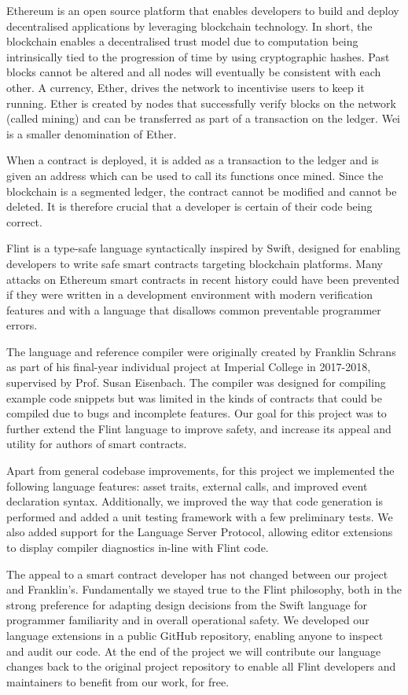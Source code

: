 Ethereum is an open source platform that enables developers to build and deploy decentralised applications by leveraging blockchain technology\cite{bg-ethereum}. In short, the blockchain enables a decentralised trust model due to computation being intrinsically tied to the progression of time by using cryptographic hashes\cite{ptb}. Past blocks cannot be altered and all nodes will eventually be consistent with each other. A currency, Ether, drives the network to incentivise users to keep it running. Ether is created by nodes that successfully verify blocks on the network (called mining) and can be transferred as part of a transaction on the ledger. Wei is a smaller denomination of Ether.

When a contract is deployed, it is added as a transaction to the ledger and is given an address which can be used to call its functions once mined\cite{md-mp}. Since the blockchain is a segmented ledger, the contract cannot be modified and cannot be deleted. It is therefore crucial that a developer is certain of their code being correct\cite{yp}.

Flint is a type-safe language syntactically inspired by Swift, designed for enabling developers to write safe smart contracts targeting blockchain platforms\cite{flint-paper}. Many attacks on Ethereum smart contracts in recent history could have been prevented if they were written in a development environment with modern verification features and with a language that disallows common preventable programmer errors.

The language and reference compiler were originally created by Franklin Schrans as part of his final-year individual project at Imperial College in 2017-2018, supervised by Prof. Susan Eisenbach\cite{flint}. The compiler was designed for compiling example code snippets but was limited in the kinds of contracts that could be compiled due to bugs and incomplete features. Our goal for this project was to further extend the Flint language to improve safety, and increase its appeal and utility for authors of smart contracts.

Apart from general codebase improvements, for this project we implemented the following language features: asset traits, external calls, and improved event declaration syntax. Additionally, we improved the way that code generation is performed and added a unit testing framework with a few preliminary tests. We also added support for the Language Server Protocol, allowing editor extensions to display compiler diagnostics in-line with Flint code.

The appeal to a smart contract developer has not changed between our project and Franklin's. Fundamentally we stayed true to the Flint philosophy, both in the strong preference for adapting design decisions from the Swift language for programmer familiarity and in overall operational safety. We developed our language extensions in a public GitHub repository, enabling anyone to inspect and audit our code. At the end of the project we will contribute our language changes back to the original project repository to enable all Flint developers and maintainers to benefit from our work, for free.
